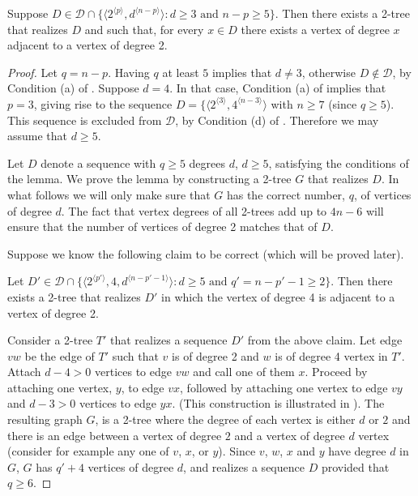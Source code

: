 \documentclass[lotsofwhite,charterfonts]{patmorin}
\newcommand{\rep}[1]{^{\langle#1\rangle}}
\begin{document}
\begin{lem}
Suppose $D\in \mathcal{D}\cap \{\langle 2\rep{p},d\rep{n-p}\rangle:
\mbox{$d\ge 3$ and $n-p \ge 5$}\}$.
Then there exists a 2-tree that realizes $D$ and such that, for every
$x\in D$ there exists a vertex
of degree $x$ adjacent to a vertex of degree 2.
\end{lem}

\begin{proof}
Let $q=n-p$. Having $q$ at least $5$ implies that $d\not=3$, otherwise
$D\not\in \mathcal{D}$, by Condition (a) of . Suppose
$d=4$. In that case, Condition (a) of  implies that
$p=3$, giving rise to the sequence $D=\{\langle
2\rep{3},4\rep{n-3}\rangle$ with $n\geq 7$ (since $q\geq 5$). This
sequence is excluded from $\mathcal{D}$, by Condition (d) of
. Therefore we may assume that $d\geq 5$.

Let $D$ denote a sequence with $q\geq 5$ degrees $d$, $d\geq 5$,
satisfying the conditions of the lemma. We prove the lemma by
constructing a 2-tree $G$ that realizes $D$. In what follows we will
only make sure that $G$ has the correct number, $q$, of vertices of
degree $d$.  The fact that vertex degrees of all 2-trees add up to
$4n-6$ will ensure that the number of vertices of degree 2 matches
that of $D$.

Suppose we know the following claim to be correct (which will be
proved later).

\begin{clm} 
Let $D'\in \mathcal{D}\cap \{\langle 2\rep{p'},4,
d\rep{n-p'-1}\rangle:\mbox{$d\ge 5$ and $q'=n-p'-1 \ge 2$}\}$.  Then
there exists a 2-tree that realizes $D'$ in which the vertex of degree
4 is adjacent to a vertex of degree 2.  
\end{clm}

Consider a 2-tree $T'$ that realizes a sequence $D'$ from the above
claim. Let edge $vw$ be the edge of $T'$ such that $v$ is of degree 2
and $w$ is of degree 4 vertex in $T'$. Attach $d-4>0$ vertices to edge
$vw$ and call one of them $x$. Proceed by attaching one vertex, $y$,
to edge $vx$, followed by attaching one vertex to edge $vy$ and
$d-3>0$ vertices to edge $yx$. (This construction is illustrated in
). The resulting graph $G$, is a 2-tree where the
degree of each vertex is either $d$ or $2$ and there is an edge
between a vertex of degree $2$ and a vertex of degree $d$ vertex
(consider for example any one of $v$, $x$, or $y$). Since $v$, $w$,
$x$ and $y$ have degree $d$ in $G$, $G$ has $q'+4$ vertices of degree
$d$, and realizes a sequence $D$ provided that $q\geq 6$.  


\end{proof}
\end{document}
